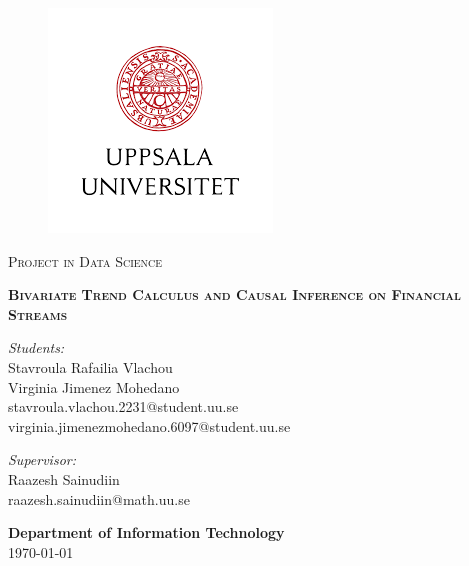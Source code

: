 \documentclass[a4, 11pt]{article}
\newcommand{\thesistitle}{Bivariate Trend Calculus and Causal Inference on Financial Streams}
\begin{document}
\begin{titlepage}

\begin{figure}
   \vspace{0.2in}
   \begin{center}
     \includegraphics[scale=0.5]{Images/UU_LOGO.png}
   \end{center}
\end{figure}

\thispagestyle{fancy}

\vspace{1in}

\center

\textsc{\large Project in Data Science }

\vspace{0.6in}

\noindent\vspace{0.1in}\makebox[\linewidth]{\rule{\linewidth}{1.2pt}}
\textsc{ \textbf{\large \thesistitle{}}}
\noindent\makebox[\linewidth]{\rule{\linewidth}{1.2pt}}

\vspace{0.5in}

 \begin{minipage}{0.58\textwidth}
    \begin{flushleft}
        \textit{Students:} \\
        Stavroula Rafailia Vlachou \\
        Virginia Jimenez Mohedano\\
        stavroula.vlachou.2231@student.uu.se\\
         virginia.jimenezmohedano.6097@student.uu.se
    \end{flushleft}
 \end{minipage}
\begin{minipage}{0.38\textwidth}
    \begin{flushright}
    \textit{Supervisor:} \\
    Raazesh Sainudiin \\
    raazesh.sainudiin@math.uu.se
    \end{flushright}
\end{minipage}

\vspace{1.6in}

\textbf{\large Department of Information Technology} \\

\today

\end{titlepage}
\end{document}
